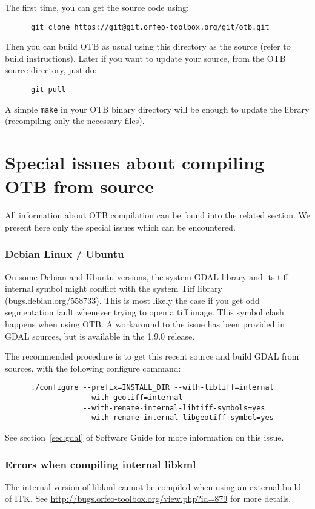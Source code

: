 The first time, you can get the source code using:
\begin{verbatim}
      git clone https://git@git.orfeo-toolbox.org/git/otb.git
\end{verbatim}

Then you can build OTB as usual using this directory as the source (refer to build instructions).
Later if you want to update your source, from the OTB source directory, just do:
\begin{verbatim}
      git pull
\end{verbatim}
A simple \texttt{make} in your OTB binary directory will be enough to update the library (recompiling only the necessary files).

\section{Special issues about compiling OTB from source}
\label{sec:FAQInstall}

All information about OTB compilation can be found into the related section.
We present here only the special issues which can be encountered.

\subsubsection{Debian Linux / Ubuntu}

On some Debian and Ubuntu versions, the system GDAL library and its tiff internal symbol might conflict with the system Tiff library (bugs.debian.org/558733). This is most likely the case if you get odd segmentation fault whenever trying to open a tiff image. This symbol clash happens when using OTB. A workaround to the issue has been provided in GDAL sources, but is available in the 1.9.0 release.

The recommended procedure is to get this recent source and build GDAL from sources, with the following configure command:
  \begin{verbatim}
      ./configure --prefix=INSTALL_DIR --with-libtiff=internal
                  --with-geotiff=internal
                  --with-rename-internal-libtiff-symbols=yes
                  --with-rename-internal-libgeotiff-symbol=yes
  \end{verbatim}

See section~\ref{sec:gdal} of Software Guide for more information on this issue.

\subsubsection{Errors when compiling internal libkml}
The internal version of libkml cannot be compiled when using an external build of ITK.
See \url{http://bugs.orfeo-toolbox.org/view.php?id=879} for more details.

